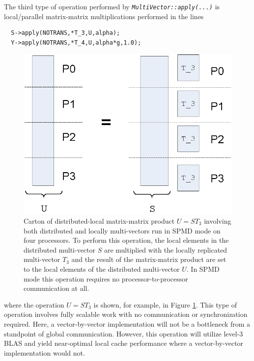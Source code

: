 The third type of operation performed by
{}\texttt{\textit{Multi\-Vector\-::apply(\-...)}} is local/parallel
matrix-matrix multiplications performed in the lines

{\scriptsize\begin{verbatim}
  S->apply(NOTRANS,*T_3,U,alpha);
  Y->apply(NOTRANS,*T_4,U,alpha*g,1.0);
\end{verbatim}}

{\bsinglespace
\begin{figure}
\begin{center}
\includegraphics*[angle=0,scale=0.60]{SPMD_Dist_Local_Matrix_Matrix_Prod_P4}
\end{center}
\caption{
\label{tsfcore:fig:SPMD_Dist_Local_Matrix_Matrix_Prod_P4}
Carton of distributed-local matrix-matrix product $U = S T_3$
involving both distributed and locally multi-vectors run in SPMD mode
on four processors.  To perform this operation, the local elements in
the distributed multi-vector $S$ are multiplied with the locally
replicated multi-vector $T_3$ and the result of the matrix-matrix
product are set to the local elements of the distributed multi-vector
$U$.  In SPMD mode this operation requires no processor-to-processor
communication at all.}
\end{figure}
\esinglespace}

{}\noindent{}where the operation $U = S T_3$ is shown, for
example, in Figure
{}\ref{tsfcore:fig:SPMD_Dist_Local_Matrix_Matrix_Prod_P4}.  This type of
operation involves fully scalable work with no communication or
synchronization required.  Here, a vector-by-vector implementation
will not be a bottleneck from a standpoint of global communication.
However, this operation will utilize level-3 BLAS and yield
near-optimal local cache performance where a vector-by-vector
implementation would not.

